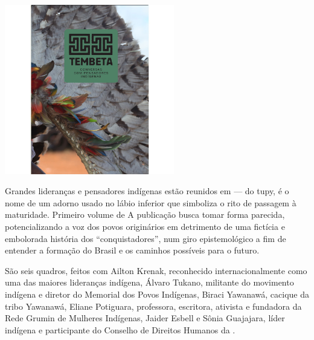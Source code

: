 \begin{center}
\hspace*{-3.6cm}
\hspace*{3.1cm}\includegraphics[width=74mm]{./grid/tembeta.jpg}
\end{center}

\hspace*{-7cm}\hrulefill\hspace*{-7cm}

\medskip

\noindent{}Grandes lideranças e pensadores indígenas estão reunidos em {} --- do tupy, é o nome de um adorno usado no lábio inferior que simboliza o rito de passagem à maturidade. Primeiro volume de  A publicação busca tomar forma parecida, potencializando a voz dos povos originários em detrimento de uma fictícia e embolorada história dos “conquistadores”, num giro epistemológico a fim de entender a formação do Brasil e os caminhos possíveis para o futuro.

São seis quadros, feitos com Ailton Krenak, reconhecido internacionalmente como uma das maiores lideranças indígena, Álvaro Tukano, militante do movimento indígena e diretor do Memorial dos Povos Indígenas, Biraci Yawanawá, cacique da tribo Yawanawá, Eliane Potiguara, professora, escritora, ativista e fundadora da Rede Grumin de Mulheres Indígenas, Jaider Esbell e Sônia Guajajara, líder indígena e participante do Conselho de Direitos Humanos da .


\vfill

